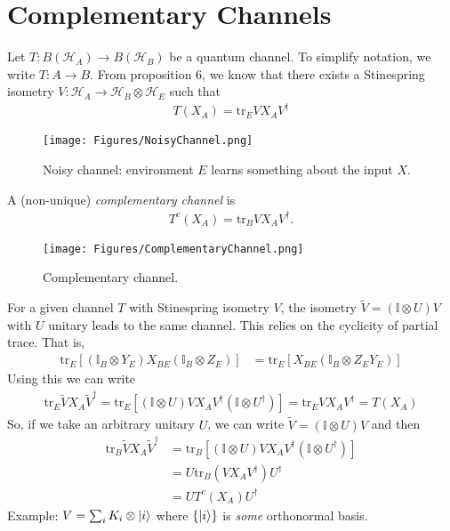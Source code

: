 \documentclass[10pt,oneside,longbibliography]{report}
\begin{document}
\section{Complementary Channels}
Let $T:B(\mathcal{H}_A)\rightarrow B(\mathcal{H}_B)$ be a quantum channel. To simplify notation, we write $T:A\rightarrow B$. From proposition 6, we know that there exists a Stinespring isometry $V:\mathcal{H}_A \rightarrow \mathcal{H}_B \otimes \mathcal{H}_E$ such that 
\begin{align}
    T(X_A) = \text{tr}_E VX_A V^{\dagger}
\end{align}

\begin{figure}
    \centering
    \texttt{[image: Figures/NoisyChannel.png]}
    \caption{Noisy channel: environment $E$ learns something about the input $X$.}
    \label{fig:NoisyChannel}
\end{figure}
 A (non-unique) \textit{complementary channel} is 
\begin{align}
    T^c (X_A) = \text{tr}_B VX_A V^{\dagger}.
\end{align}
\begin{figure}[h]
    \centering
    \texttt{[image: Figures/ComplementaryChannel.png]}
    \caption{Complementary channel.}
    \label{fig:ComplementaryChannel}
\end{figure}
For a given channel $T$ with Stinespring isometry $V$, the isometry $\tilde{V}=(\mathbb{I} \otimes U)V$ with $U$ unitary leads to the same channel. This relies on the cyclicity of partial trace. That is, 
\begin{align}
    \text{tr}_E \left[(\mathbb{I}_B \otimes Y_E) X_{BE} (\mathbb{I}_B \otimes Z_E)\right] &= \text{tr}_E \left[X_{BE}(\mathbb{I}_B\otimes Z_E Y_E)\right]
\end{align}
Using this we can write
\begin{align}
    \text{tr}_E \tilde{V} X_A \tilde{V}^{\dagger} = \text{tr}_E \left[(\mathbb{I} \otimes U) VX_A V^{\dagger}(\mathbb{I}\otimes U^{\dagger})\right] = \text{tr}_E V X_A V^{\dagger} = T(X_A)
\end{align}
So, if we take an arbitrary unitary $U$, we can write $\tilde{V} =(\mathbb{I} \otimes U)V$ and then
\begin{align}
    \text{tr}_B \tilde{V}X_A \tilde{V}^{\dagger} &= \text{tr}_B \left[(\mathbb{I}\otimes U ) VX_A V^{\dagger} (\mathbb{I}\otimes U^{\dagger})\right]\\
    &= U \text{tr}_B (V X_A V^{\dagger})U^{\dagger} \\
    &= U T^c (X_A) U^{\dagger}
\end{align}
Example: $V=\sum_i K_i \otimes \ket{i}$ where $\{\ket{i}\}$ is \textit{some} orthonormal basis. 
\end{document}
